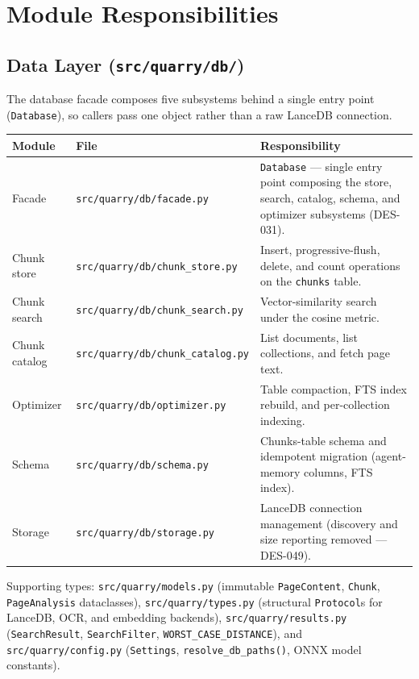 \documentclass[a4paper,10pt]{article}
\newcommand{\modpath}[1]{\texttt{src/quarry/#1}}
\begin{document}
\section{Module Responsibilities}

\subsection{Data Layer (\modpath{db/})}

The database facade composes five subsystems behind a single entry
point (\texttt{Database}), so callers pass one object rather than a raw
LanceDB connection.

\begin{center}
\begin{tabular}{llp{7cm}}
\toprule
\textbf{Module} & \textbf{File} & \textbf{Responsibility} \\
\midrule
Facade        & \modpath{db/facade.py}        & \texttt{Database} ---
                single entry point composing the store, search, catalog,
                schema, and optimizer subsystems (DES-031). \\
Chunk store   & \modpath{db/chunk\_store.py}   & Insert,
                progressive-flush, delete, and count operations on the
                \texttt{chunks} table. \\
Chunk search  & \modpath{db/chunk\_search.py}  & Vector-similarity
                search under the cosine metric. \\
Chunk catalog & \modpath{db/chunk\_catalog.py} & List documents, list
                collections, and fetch page text. \\
Optimizer     & \modpath{db/optimizer.py}      & Table compaction, FTS
                index rebuild, and per-collection indexing. \\
Schema        & \modpath{db/schema.py}         & Chunks-table schema and
                idempotent migration (agent-memory columns, FTS index). \\
Storage       & \modpath{db/storage.py}        & LanceDB connection
                management (discovery and size reporting removed --- DES-049). \\
\bottomrule
\end{tabular}
\end{center}

Supporting types: \modpath{models.py} (immutable \texttt{PageContent},
\texttt{Chunk}, \texttt{PageAnalysis} dataclasses), \modpath{types.py}
(structural \texttt{Protocol}s for LanceDB, OCR, and embedding
backends), \modpath{results.py} (\texttt{SearchResult},
\texttt{SearchFilter}, \texttt{WORST\_CASE\_DISTANCE}), and
\modpath{config.py} (\texttt{Settings}, \texttt{resolve\_db\_paths()},
ONNX model constants).
\end{document}
